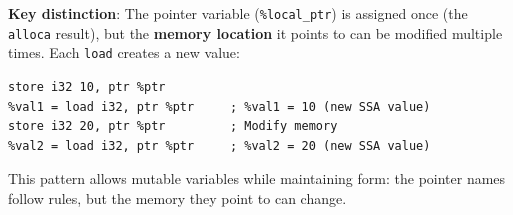 \textbf{Key distinction}: The pointer variable (\texttt{\%local\_ptr}) is assigned once (the \texttt{alloca} result), but the \textbf{memory location} it points to can be modified multiple times. Each \texttt{load} creates a new  value:

\begin{lstlisting}[style=ir]
%ptr = alloca i32              ; %ptr assigned once (address)
store i32 10, ptr %ptr
%val1 = load i32, ptr %ptr     ; %val1 = 10 (new SSA value)
store i32 20, ptr %ptr         ; Modify memory
%val2 = load i32, ptr %ptr     ; %val2 = 20 (new SSA value)
\end{lstlisting}

This pattern allows mutable variables while maintaining  form: the pointer names follow  rules, but the memory they point to can change.
